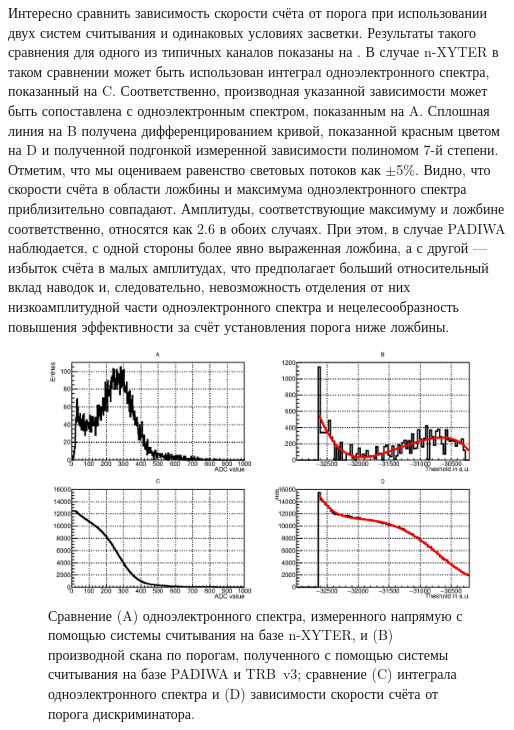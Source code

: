 Интересно сравнить зависимость скорости счёта от порога при использовании двух систем считывания и одинаковых условиях засветки. Результаты такого сравнения для одного из типичных каналов показаны на . В случае n-XYTER в таком сравнении может быть использован интеграл одноэлектронного спектра, показанный на C. Соответственно, производная указанной зависимости может быть сопоставлена с одноэлектронным спектром, показанным на A. Сплошная линия на B получена дифференцированием кривой, показанной красным цветом на D и полученной подгонкой измеренной зависимости полиномом 7-й степени. Отметим, что мы оцениваем равенство световых потоков как $ \pm $5\%. Видно, что скорости счёта в области ложбины и максимума одноэлектронного спектра приблизительно совпадают. Амплитуды, соответствующие максимуму и ложбине соответственно, относятся как 2.6 в обоих случаях. При этом, в случае PADIWA наблюдается, с одной стороны более явно выраженная ложбина, а с другой --- избыток счёта в малых амплитудах, что предполагает больший относительный вклад наводок и, следовательно, невозможность отделения от них низкоамплитудной части одноэлектронного спектра и нецелесообразность повышения эффективности за счёт установления порога ниже ложбины.

\begin{figure}[H]
\includegraphics[width=1.0\textwidth]{pictures/32_Blackboard_4feb.eps}
\caption{Сравнение (A) одноэлектронного спектра, измеренного напрямую с помощью системы считывания на базе n-XYTER, и (B) производной скана по порогам, полученного с помощью системы считывания на базе PADIWA и TRB~v3; сравнение (C) интеграла одноэлектронного спектра и (D) зависимости скорости счёта от порога дискриминатора.}
\label{fig:Blackboard}
\end{figure}
